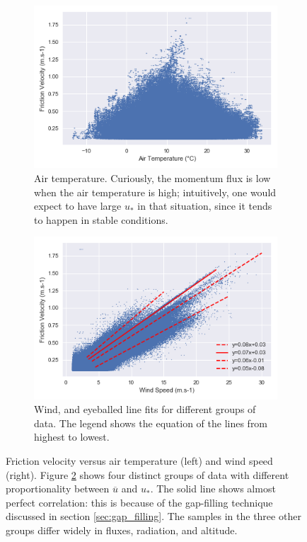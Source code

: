 \documentclass[a4paper,11pt]{kth-mag}
\begin{document}
\begin{figure}
    \centering
    \begin{subfigure}[t]{0.48\textwidth}
        \centering
        \includegraphics[width=\textwidth]{images/ustar_temp}
        \caption{Air temperature. Curiously, the momentum flux is low when the air temperature is high; intuitively, one would expect to have large $u_*$ in that situation, since it tends to happen in stable conditions.}
        \label{fig:ustar_temp}
    \end{subfigure}
    \hfill
    \begin{subfigure}[t]{0.48\textwidth}
        \centering
        \includegraphics[width=\textwidth]{images/ustar_wind}
        \caption{Wind, and eyeballed line fits for different groups of data. The legend shows the equation of the lines from highest to lowest.}
        \label{fig:ustar_wind}
    \end{subfigure}
    \caption{Friction velocity versus air temperature (left) and wind speed (right). Figure \ref{fig:ustar_wind} shows four distinct groups of data with different proportionality between $\overline{u}$ and $u_*$. The solid line shows almost perfect correlation: this is because of the gap-filling technique discussed in section \ref{sec:gap_filling}. The samples in the three other groups differ widely in fluxes, radiation, and altitude.}
	\label{fig:ustar_wind_temp}
\end{figure}
\end{document}
